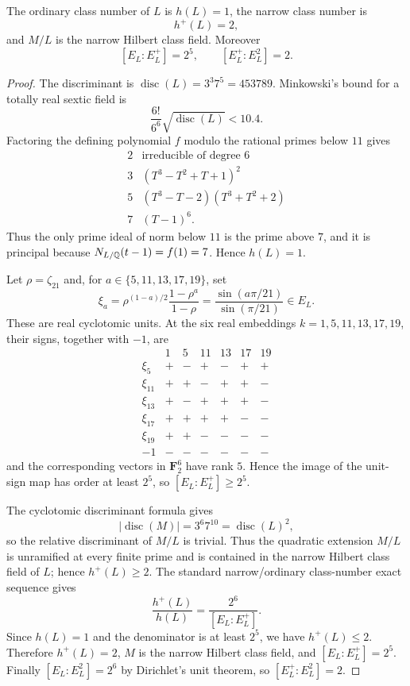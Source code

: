 \begin{lemma}\label{lem:narrowclass}
The ordinary class number of $L$ is $h(L)=1$, the narrow class number is
\[
 h^+(L)=2,
\]
and $M/L$ is the narrow Hilbert class field.  Moreover
\[
 [E_L:E_L^+]=2^5,\qquad [E_L^+:E_L^2]=2.
\]
\end{lemma}
\begin{proof}
The discriminant is $\operatorname{disc}(L)=3^3 7^5=453789$.  Minkowski's bound for a totally real sextic field is
\[
 \frac{6!}{6^6}\sqrt{\operatorname{disc}(L)}<10.4.
\]
Factoring the defining polynomial $f$ modulo the rational primes below $11$ gives
\[
\begin{array}{c|c}
2&\text{irreducible of degree }6\\
3&(T^3-T^2+T+1)^2\\
5&(T^3-T-2)(T^3+T^2+2)\\
7&(T-1)^6.
\end{array}
\]
Thus the only prime ideal of norm below $11$ is the prime above $7$, and it is principal because $N_{L/\mathbb Q}(t-1)=f(1)=7$.  Hence $h(L)=1$.

Let $\rho=\zeta_{21}$ and, for $a\in\{5,11,13,17,19\}$, set
\[
 \xi_a=\rho^{(1-a)/2}\frac{1-\rho^a}{1-\rho}
      =\frac{\sin(a\pi/21)}{\sin(\pi/21)}\in E_L.
\]
These are real cyclotomic units.  At the six real embeddings $k=1,5,11,13,17,19$, their signs, together with $-1$, are
\[
\begin{array}{c|rrrrrr}
 &1&5&11&13&17&19\\ \hline
\xi_5  &+&-&+&-&+&+\\
\xi_{11}&+&+&-&+&+&-\\
\xi_{13}&+&-&+&+&+&-\\
\xi_{17}&+&+&+&+&-&-\\
\xi_{19}&+&+&-&-&-&-\\
-1      &-&-&-&-&-&-
\end{array}
\]
and the corresponding vectors in $\mathbf F_2^6$ have rank $5$.  Hence the image of the unit-sign map has order at least $2^5$, so $[E_L:E_L^+]\ge2^5$.

The cyclotomic discriminant formula gives
\[
 |\operatorname{disc}(M)|=3^6 7^{10}=\operatorname{disc}(L)^2,
\]
so the relative discriminant of $M/L$ is trivial.  Thus the quadratic extension $M/L$ is unramified at every finite prime and is contained in the narrow Hilbert class field of $L$; hence $h^+(L)\ge2$.  The standard narrow/ordinary class-number exact sequence gives
\[
 \frac{h^+(L)}{h(L)}=\frac{2^6}{[E_L:E_L^+]}.
\]
Since $h(L)=1$ and the denominator is at least $2^5$, we have $h^+(L)\le2$.  Therefore $h^+(L)=2$, $M$ is the narrow Hilbert class field, and $[E_L:E_L^+]=2^5$.  Finally $[E_L:E_L^2]=2^6$ by Dirichlet's unit theorem, so $[E_L^+:E_L^2]=2$.
\end{proof}

